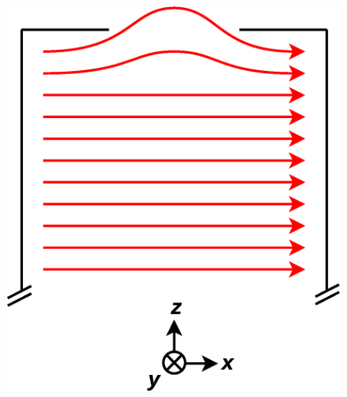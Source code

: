 \documentclass[handout]{beamer}
\begin{document}
\begin{frame}
\begin{columns}[b]
    \begin{column}{0.5\textwidth}
    \begin{figure}
    \includegraphics[width=\textwidth]
    {figures/field_endcap.eps}
    \end{figure}
    \vspace{0pt}
    \end{column}
    
\end{columns}

\end{frame}

%
%
\end{document}
